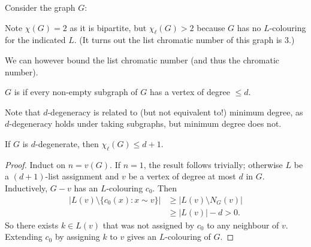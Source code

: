 \documentclass[main.tex]{subfiles}
\begin{document}
\begin{example*}
  Consider the graph $G$:
  \begin{center}
  \end{center}
  Note $\chi(G) = 2$ as it is bipartite, but $\chi_\ell(G) > 2$ because
  $G$ has no $L$-colouring for the indicated $L$.
  (It turns out the list chromatic number of this graph is 3.)
\end{example*}
We can however bound the list chromatic number (and thus the chromatic number).
\begin{definition*}[$d$-degenerate]
  $G$ is  if every non-empty subgraph of
  $G$ has a vertex of degree $\leq d$.
\end{definition*}
Note that $d$-degeneracy is related to (but not equivalent to!) minimum degree,
as $d$-degeneracy holds under taking subgraphs, but minimum degree does not.
\begin{proposition}
  If $G$ is $d$-degenerate, then $\chi_\ell(G)\leq d+1$.
\end{proposition}
\begin{proof}
  Induct on $n = v(G)$.
  If $n = 1$, the result follows trivially; otherwise $L$ be a $(d+1)$-list
  assignment and $v$ be a vertex of degree at most $d$ in $G$.
  Inductively, $G-v$ has an $L$-colouring $c_0$.
  Then
  \begin{align*}
    |L(v)\setminus\{c_0(x) : x\sim v\}| &\geq|L(v)\setminus N_G(v)| \\
                                        &\geq |L(v)| - d > 0.
  \end{align*}
  So there exists $k\in L(v)$ that was not assigned by $c_0$ to any neighbour
  of $v$.
  Extending $c_0$ by assigning $k$ to $v$ gives an $L$-colouring of $G$.
\end{proof}
\end{document}
